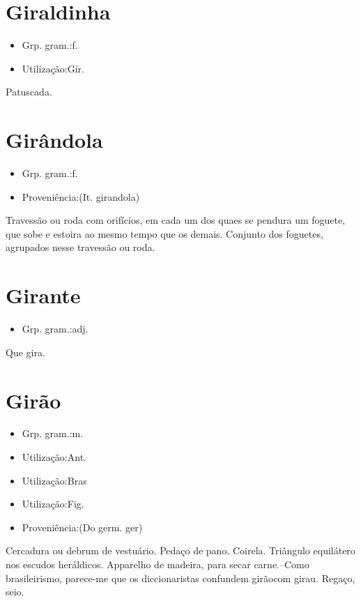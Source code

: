 \section{Giraldinha}
\begin{itemize}
\item {Grp. gram.:f.}
\end{itemize}
\begin{itemize}
\item {Utilização:Gír.}
\end{itemize}
Patuscada.
\section{Girândola}
\begin{itemize}
\item {Grp. gram.:f.}
\end{itemize}
\begin{itemize}
\item {Proveniência:(It. \textunderscore girandola\textunderscore )}
\end{itemize}
Travessão ou roda com orifícios, em cada um dos quaes se pendura um foguete, que sobe e estoira ao mesmo tempo que os demais.
Conjunto dos foguetes, agrupados nesse travessão ou roda.
\section{Girante}
\begin{itemize}
\item {Grp. gram.:adj.}
\end{itemize}
Que gira.
\section{Girão}
\begin{itemize}
\item {Grp. gram.:m.}
\end{itemize}
\begin{itemize}
\item {Utilização:Ant.}
\end{itemize}
\begin{itemize}
\item {Utilização:Bras}
\end{itemize}
\begin{itemize}
\item {Utilização:Fig.}
\end{itemize}
\begin{itemize}
\item {Proveniência:(Do germ. \textunderscore ger\textunderscore )}
\end{itemize}
Cercadura ou debrum de vestuário.
Pedaço de pano.
Coirela.
Triângulo equilátero nos escudos heráldicos.
Apparelho de madeira, para secar carne.--Como brasileirismo, parece-me que os diccionaristas confundem \textunderscore girão\textunderscore  com \textunderscore girau\textunderscore .
Regaço, seio.
